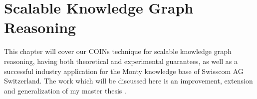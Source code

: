 \chapter{Scalable Knowledge Graph Reasoning}
\label{chp: kg_reasoning}


This chapter will cover our COINs technique for scalable knowledge graph reasoning, having both theoretical and experimental guarantees, as well as a successful industry application for the Monty knowledge base of Swisscom AG Switzerland. The work which will be discussed here is an improvement, extension and generalization of my master thesis \cite{janchevski_graph_2021}.



